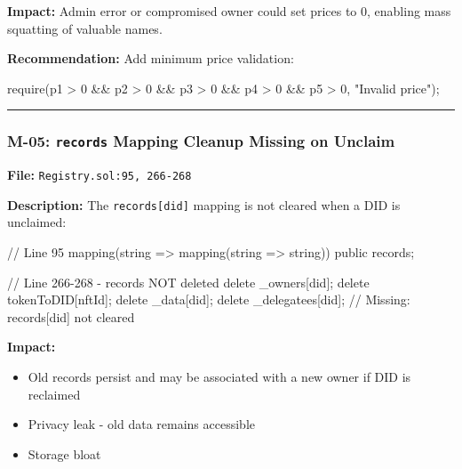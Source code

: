 \documentclass[
]{article}
\newenvironment{Shaded}{}{}
\newcommand{\NormalTok}[1]{#1}
\providecommand{\tightlist}{%
  \setlength{\itemsep}{0pt}\setlength{\parskip}{0pt}}
\begin{document}
\textbf{Impact:} Admin error or compromised owner could set prices to 0,
enabling mass squatting of valuable names.

\textbf{Recommendation:} Add minimum price validation:

\begin{Shaded}
\begin{Highlighting}[]
\NormalTok{require(p1 \textgreater{} 0 \&\& p2 \textgreater{} 0 \&\& p3 \textgreater{} 0 \&\& p4 \textgreater{} 0 \&\& p5 \textgreater{} 0, "Invalid price");}
\end{Highlighting}
\end{Shaded}

\begin{center}\rule{0.5\linewidth}{0.5pt}\end{center}

\subsubsection{\texorpdfstring{M-05: \texttt{records} Mapping Cleanup
Missing on
Unclaim}{M-05: records Mapping Cleanup Missing on Unclaim}}\label{m-05-records-mapping-cleanup-missing-on-unclaim}

\textbf{File:} \texttt{Registry.sol:95,\ 266-268}

\textbf{Description:} The \texttt{records{[}did{]}} mapping is not
cleared when a DID is unclaimed:

\begin{Shaded}
\begin{Highlighting}[]
\NormalTok{// Line 95}
\NormalTok{mapping(string =\textgreater{} mapping(string =\textgreater{} string)) public records;}

\NormalTok{// Line 266{-}268 {-} records NOT deleted}
\NormalTok{delete \_owners[did];}
\NormalTok{delete tokenToDID[nftId];}
\NormalTok{delete \_data[did];}
\NormalTok{delete \_delegatees[did];}
\NormalTok{// Missing: records[did] not cleared}
\end{Highlighting}
\end{Shaded}

\textbf{Impact:}

\begin{itemize}
\tightlist
\item
  Old records persist and may be associated with a new owner if DID is
  reclaimed
\item
  Privacy leak - old data remains accessible
\item
  Storage bloat
\end{itemize}
\end{document}
